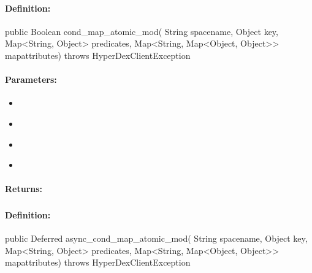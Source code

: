\paragraph{Definition:}
\begin{javacode}
public Boolean cond_map_atomic_mod(
        String spacename,
        Object key,
        Map<String, Object> predicates,
        Map<String, Map<Object, Object>> mapattributes) throws HyperDexClientException
\end{javacode}

\paragraph{Parameters:}
\begin{itemize}[noitemsep]
\item {}\\

\item {}\\

\item {}\\

\item {}\\

\end{itemize}

\paragraph{Returns:}


\pagebreak
\subsubsection{}
\label{api:java:async_cond_map_atomic_mod}


\paragraph{Definition:}
\begin{javacode}
public Deferred async_cond_map_atomic_mod(
        String spacename,
        Object key,
        Map<String, Object> predicates,
        Map<String, Map<Object, Object>> mapattributes) throws HyperDexClientException
\end{javacode}

